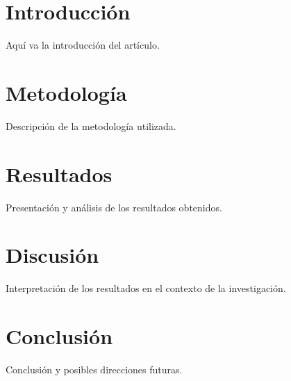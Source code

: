 \documentclass{cyta}
\title{\documentTitle}
\author{\authorName \\ \affiliation}
\date{\today}
\begin{document}
\maketitle

\begin{abstract}
    \abstractText
    Este es el resumen del artículo.
\end{abstract}

\section{Introducción}
Aquí va la introducción del artículo.

\section{Metodología}
Descripción de la metodología utilizada.

\section{Resultados}
Presentación y análisis de los resultados obtenidos.

\section{Discusión}
Interpretación de los resultados en el contexto de la investigación.

\section{Conclusión}
Conclusión y posibles direcciones futuras.



\end{document}
